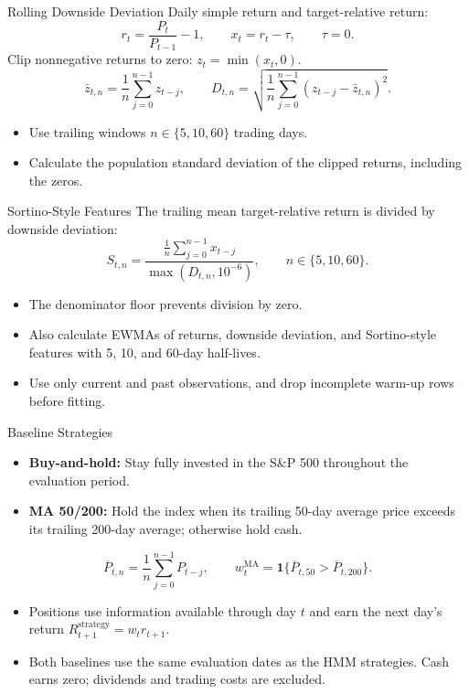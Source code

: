 \begin{frame}{Rolling Downside Deviation}
\small
Daily simple return and target-relative return:
\[
 r_t=\frac{P_t}{P_{t-1}}-1,
 \qquad x_t=r_t-\tau,\qquad \tau=0.
\]
Clip nonnegative returns to zero: $z_t=\min(x_t,0)$.
\[
 \bar z_{t,n}=\frac{1}{n}\sum_{j=0}^{n-1}z_{t-j},
 \qquad
 D_{t,n}=\sqrt{\frac{1}{n}\sum_{j=0}^{n-1}
 (z_{t-j}-\bar z_{t,n})^2}.
\]
\begin{itemize}
    \item Use trailing windows $n\in\{5,10,60\}$ trading days.
    \item Calculate the population standard deviation of the clipped returns, including the zeros.
\end{itemize}
\end{frame}

\begin{frame}{Sortino-Style Features}
The trailing mean target-relative return is divided by downside deviation:
\[
 S_{t,n}=\frac{\displaystyle\frac{1}{n}\sum_{j=0}^{n-1}x_{t-j}}
 {\max(D_{t,n},10^{-6})},
 \qquad n\in\{5,10,60\}.
\]
\begin{itemize}
    \item The denominator floor prevents division by zero.
    \item Also calculate EWMAs of returns, downside deviation, and Sortino-style features with 5, 10, and 60-day half-lives.
    \item Use only current and past observations, and drop incomplete warm-up rows before fitting.
\end{itemize}
\end{frame}

\begin{frame}{Baseline Strategies}
\begin{itemize}
    \item \textbf{Buy-and-hold:} Stay fully invested in the S\&P 500 throughout the evaluation period.
    \item \textbf{MA 50/200:} Hold the index when its trailing 50-day average price exceeds its trailing 200-day average; otherwise hold cash.
\end{itemize}
\[
 \overline P_{t,n}=\frac{1}{n}\sum_{j=0}^{n-1}P_{t-j},
 \qquad
 w_t^{\mathrm{MA}}=\mathbf{1}\{\overline P_{t,50}>\overline P_{t,200}\}.
\]
\begin{itemize}
    \item Positions use information available through day $t$ and earn the next day's return $R_{t+1}^{\mathrm{strategy}}=w_t r_{t+1}$.
    \item Both baselines use the same evaluation dates as the HMM strategies. Cash earns zero; dividends and trading costs are excluded.
\end{itemize}
\end{frame}

